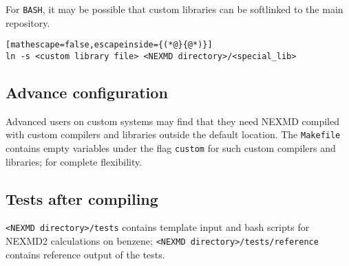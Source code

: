 For \verb+BASH+,
it may be possible that custom libraries can be softlinked to the main repository.
\begin{lstlisting}[mathescape=false,escapeinside={(*@}{@*)}]
ln -s <custom library file> <NEXMD directory>/<special_lib>
\end{lstlisting}

\subsection{Advance configuration}

Advanced users on custom systems may find that they need NEXMD compiled with custom compilers and libraries outside the default location. 
The \verb+Makefile+ contains empty variables under the flag \verb+custom+
for such custom compilers and libraries; for complete flexibility.

\subsection{Tests after compiling}
\verb+<NEXMD directory>/tests+ contains template input and bash scripts for NEXMD2 calculations on benzene;
\verb+<NEXMD directory>/tests/reference+ contains reference output of the tests.